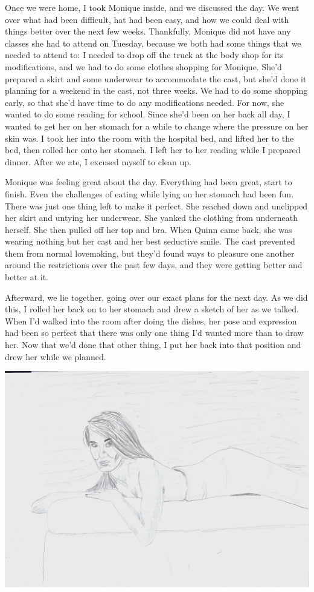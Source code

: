 Once we were home, I took Monique inside, and we discussed the day. We went over what had
been difficult, hat had been easy, and how we could deal with things better over the next few
weeks. Thankfully, Monique did not have any classes she had to attend on Tuesday, because we
both had some things that we needed to attend to: I needed to drop off the truck at the body
shop for its modifications, and we had to do some clothes shopping for Monique. She'd prepared a
skirt and some underwear to accommodate the cast, but she'd done it planning for a weekend in
the cast, not three weeks. We had to do some shopping early, so that she'd have time to do any
modifications needed. For now, she wanted to do some reading for school. Since she'd been on her
back all day, I wanted to get her on her stomach for a while to change where the pressure on her
skin was. I took her into the room with the hospital bed, and lifted her to the bed, then rolled
her onto her stomach. I left her to her reading while I prepared dinner. After we ate, I excused
myself to clean up.

\begin{thought}
Monique was feeling great about the day. Everything had been great, start to finish. Even
the challenges of eating while lying on her stomach had been fun. There was just one thing left
to make it perfect. She reached down and unclipped her skirt and untying her underwear. She
yanked the clothing from underneath herself. She then pulled off her top and bra. When Quinn
came back, she was wearing nothing but her cast and her best seductive smile. The cast prevented
them from normal lovemaking, but they'd found ways to pleasure one another around the
restrictions over the past few days, and they were getting better and better at it.
\end{thought}

Afterward, we lie together, going over our exact plans for the next day. As we did this, I
rolled her back on to her stomach and drew a sketch of her as we talked. When I'd walked into
the room after doing the dishes, her pose and expression had been so perfect that there was only
one thing I'd wanted more than to draw her. Now that we'd done that other thing, I put her back
into that position and drew her while we planned.

\begin{center}
\includegraphics[width=\textwidth]{images/kicks45.jpg}
\end{center}
